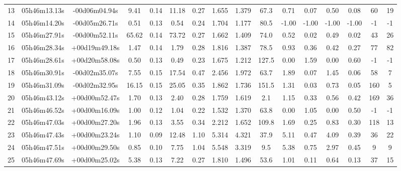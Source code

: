 \begin{landscape}
\begin{ThreePartTable}
\begin{xltabular}{\linewidth}{Xccccccccccccccc}
            13 &  05h46m13.13s &  -00d06m04.94s &  9.41 &    0.14 & 11.18 &     0.27 & 1.655 & 1.379 &  67.3 &  0.71 &    0.07 &  0.50 &    0.08 &   60 &      19 \\
            14 &  05h46m14.20s &  -00d05m26.71s &  0.51 &    0.13 &  0.54 &     0.24 & 1.704 & 1.177 &  80.5 & -1.00 &   -1.00 & -1.00 &   -1.00 &   -1 &      -1 \\
            15 &  05h46m27.91s &  -00d00m52.11s & 65.62 &    0.14 & 73.72 &     0.27 & 1.662 & 1.409 &  74.0 &  0.52 &    0.02 &  0.49 &    0.02 &   43 &      26 \\
            16 &  05h46m28.34s &  +00d19m49.18s &  1.47 &    0.14 &  1.79 &     0.28 & 1.816 & 1.387 &  78.5 &  0.93 &    0.36 &  0.42 &    0.27 &   77 &      82 \\
            17 &  05h46m28.61s &  +00d20m58.08s &  0.50 &    0.13 &  0.49 &     0.23 & 1.675 & 1.212 & 127.5 &  0.00 &    1.59 &  0.00 &    0.60 &   -1 &      -1 \\
            18 &  05h46m30.91s &  -00d02m35.07s &  7.55 &    0.15 & 17.54 &     0.47 & 2.456 & 1.972 &  63.7 &  1.89 &    0.07 &  1.45 &    0.06 &   58 &       7 \\
            19 &  05h46m31.09s &  -00d02m32.95s & 16.15 &    0.15 & 25.05 &     0.35 & 1.862 & 1.736 & 151.5 &  1.31 &    0.03 &  0.73 &    0.05 &  160 &       5 \\
            20 &  05h46m43.12s &  +00d00m52.47s &  1.70 &    0.13 &  2.40 &     0.28 & 1.759 & 1.619 &   2.1 &  1.15 &    0.33 &  0.56 &    0.42 &  169 &      36 \\
            21 &  05h46m46.52s &  +00d00m16.09s &  1.00 &    0.12 &  1.04 &     0.22 & 1.532 & 1.370 &  63.8 &  0.00 &    1.05 &  0.00 &    0.50 &   -1 &      -1 \\
            22 &  05h46m47.03s &  +00d00m27.20s &  1.96 &    0.13 &  3.55 &     0.34 & 2.212 & 1.652 & 109.8 &  1.69 &    0.25 &  0.83 &    0.30 &  118 &      13 \\
            23 &  05h46m47.43s &  +00d00m23.24s &  1.10 &    0.09 & 12.48 &     1.10 & 5.314 & 4.321 &  37.9 &  5.11 &    0.47 &  4.09 &    0.39 &   36 &      22 \\
            24 &  05h46m47.51s &  +00d00m29.50s &  0.85 &    0.10 &  7.75 &     1.04 & 5.548 & 3.319 &   9.5 &  5.38 &    0.75 &  2.97 &    0.45 &    9 &       9 \\
            25 &  05h46m47.69s &  +00d00m25.02s &  5.38 &    0.13 &  7.22 &     0.27 & 1.810 & 1.496 &  53.6 &  1.01 &    0.11 &  0.64 &    0.13 &   37 &      15 \\

\end{xltabular}
\end{ThreePartTable}
\end{landscape}
